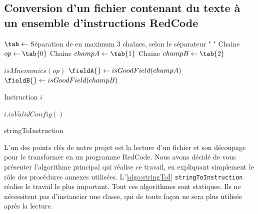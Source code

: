 \documentclass[hidelinks]{report}
\begin{document}
\subsection{Conversion d'un fichier contenant du texte à un ensemble d'instructions RedCode\label{subsec:conversion}}
\LinesNumbered
\begin{algorithm}
\DontPrintSemicolon
{}
$\tab \gets$ Séparation de \s en maximum 3 chaînes, selon le séparateur " "\;
Chaine $op \gets \tab{0}$\;
Chaine $champA \gets \tab{1}$\;
Chaine $champB \gets \tab{2}$\;

$isMnemonics(op)$\;
$\fieldA{} \gets isGoodField(champA)$\;
$\fieldB{} \gets isGoodField(champB)$\;

Instruction $i$\;

$i.isValidConfig()$\;

\caption{\sc stringToInstruction}
\label{algo:stringToI}
\end{algorithm}

L'un des points clés de notre projet est la lecture d'un fichier et son découpage pour le transformer en un programme RedCode. Nous avons décidé de vous présenter l'algorithme principal qui réalise ce travail, en expliquant simplement le rôle des procédures annexes utilisées. L'\autoref{algo:stringToI} \texttt{stringToInstruction} réalise le travail le plus important. Tout ces algorithmes sont statiques. Ils ne nécessitent pas d'instancier une classe, qui de toute façon ne sera plus utilisée après la lecture. 
\end{document}
